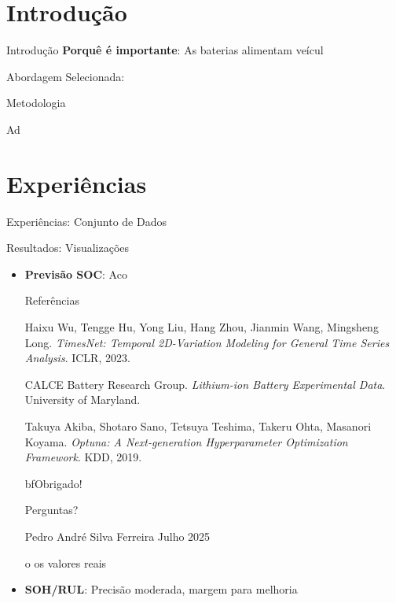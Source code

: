   \vspace{0.3cm}
  
  \tex\section{Introdução}
\begin{frame}{Introdução}
  \textbf{Porquê é importante}: As baterias alimentam veícul\begin{frame}{Abordagem Selecionada: \begin{frame}{Metodologia}
  \begin{block}{Ad\section{Experiências}
\begin{frame}{Experiências: Conjunto de Dados}
  \begin{block}{\begin{frame}{Resultados: Visualizações}
  \begin{itemize}
    \item \textbf{Previsão SOC}: Aco\begin{frame}[plain]
  \cent%
\begin{frame}{Referências}
  \begin{thebibliography}{9}
      Haixu Wu, Tengge Hu, Yong Liu, Hang Zhou, Jianmin Wang, Mingsheng Long.
      \emph{TimesNet: Temporal 2D-Variation Modeling for General Time Series Analysis}.
      ICLR, 2023.
    
      CALCE Battery Research Group.
      \emph{Lithium-ion Battery Experimental Data}.
      University of Maryland.
      
      Takuya Akiba, Shotaro Sano, Tetsuya Teshima, Takeru Ohta, Masanori Koyama.
      \emph{Optuna: A Next-generation Hyperparameter Optimization Framework}.
      KDD, 2019.
  \end{thebibliography}
\end{frame}bf{Obrigado!}
  
  \vspace{1cm}
  
  \normalsize
  Perguntas?
  
  \vspace{0.5cm}
  \small
  Pedro André Silva Ferreira
  Julho 2025
\end{frame}o os valores reais
    \item \textbf{SOH/RUL}: Precisão moderada, margem para melhoria
  \end{itemize}
  

\end{frame}}
\end{block}
\end{frame}}
\end{block}
\end{frame}}
\end{frame}
\end{frame}
